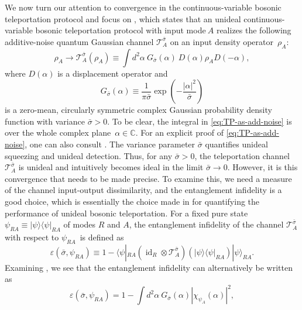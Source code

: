 \documentclass[apsrev,twocolumn]{revtex4-1}%
\begin{document}
We now turn our attention to convergence in the continuous-variable bosonic
teleportation protocol and focus on \cite[Eq.~(9)]{prl1998braunstein}, which
states that an unideal continuous-variable bosonic teleportation protocol with
input mode$~A$ realizes the following additive-noise quantum Gaussian channel
$\mathcal{T}_{A}^{\bar{\sigma}}$ on an input density operator~$\rho_{A}$:%
\begin{equation}
\rho_{A}\rightarrow\mathcal{T}_{A}^{\bar{\sigma}}(\rho_{A})\equiv\int
d^{2}\alpha\ G_{\bar{\sigma}}(\alpha)\ D(\alpha)\rho_{A}D(-\alpha),
\label{eq:TP-as-add-noise}%
\end{equation}
where $D(\alpha)$ is a displacement operator \cite{S17} and%
\begin{equation}
G_{\bar{\sigma}}(\alpha)\equiv\frac{1}{\pi\bar{\sigma}}\exp\!\left(
-\frac{\left\vert \alpha\right\vert ^{2}}{\bar{\sigma}}\right)
\label{eq:complex-Gauss}%
\end{equation}
is a zero-mean, circularly symmetric complex Gaussian probability density
function with variance $\bar{\sigma}>0$. To be clear, the integral in
\eqref{eq:TP-as-add-noise} is over the whole complex plane~$\alpha
\in\mathbb{C}$. For an explicit proof of \eqref{eq:TP-as-add-noise}, one can
also consult \cite{TBS02,BST02}. The variance parameter $\bar{\sigma}$
quantifies unideal squeezing and unideal detection. Thus, for any $\bar
{\sigma}>0$, the teleportation channel $\mathcal{T}_{A}^{\bar{\sigma}}$ is
unideal and intuitively becomes ideal in the limit $\bar{\sigma}\rightarrow0$.
However, it is this convergence that needs to be made precise. To examine
this, we need a measure of the channel input-output dissimilarity, and the
entanglement infidelity is a good choice, which is essentially the choice made
in \cite{prl1998braunstein} for quantifying the performance of unideal bosonic
teleportation. For a fixed pure state $\psi_{RA}\equiv|\psi\rangle\langle
\psi|_{RA}$ of modes $R$ and $A$, the entanglement infidelity of the channel
$\mathcal{T}_{A}^{\bar{\sigma}}$ with respect to $\psi_{RA}$\ is defined as%
\begin{equation}
\varepsilon(\bar{\sigma},\psi_{RA})\equiv1-\langle\psi|_{RA}(\operatorname{id}%
_{R}\otimes\mathcal{T}_{A}^{\bar{\sigma}})(|\psi\rangle\langle\psi|_{RA}%
)|\psi\rangle_{RA}. \label{eq:ent-infidel}%
\end{equation}
Examining \cite[Eq. (11)]{prl1998braunstein}, we see that the entanglement
infidelity can alternatively be written as%
\begin{equation}
\varepsilon(\bar{\sigma},\psi_{RA})=1-\int d^{2}\alpha\ G_{\bar{\sigma}%
}(\alpha)\left\vert \chi_{\psi_{A}}(\alpha)\right\vert ^{2},
\end{equation}
\end{document}
